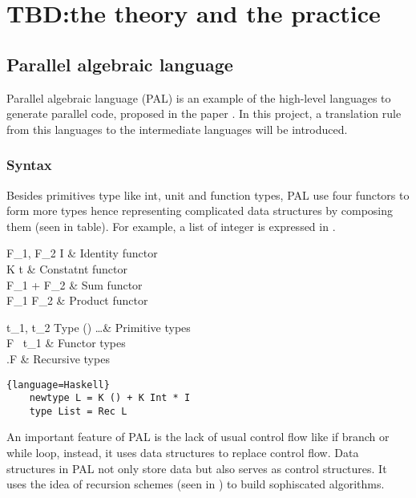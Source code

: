 \chapter{TBD:the theory and the practice}
\section{Parallel algebraic language} \label{b:pal}
Parallel algebraic language (PAL) is an example of the high-level languages to generate parallel code, proposed in the paper \cite{AlgebraicMultipartyProtocol}. In this project, a translation rule from this languages to the intermediate languages will be introduced.
\subsection{Syntax}
Besides primitives type like int, unit and function types, PAL use four functors to form more types hence representing complicated data structures by composing them (seen in table). For example, a list of integer is expressed in .
\begin{table}[ht]
\begin{grammar}{F_1, F_2 \Coloneqq}{}
    I & Identity functor\\
    K t & Constatnt functor\\
    F_1 + F_2 & Sum functor\\
    F_1 \times F_2 & Product functor
\end{grammar}
\hfill
\begin{grammar}{t_1, t_2 \Coloneqq}{Type}
    () \mid {} \mid \dots & Primitive types\\
    F \ t_1 & Functor types\\
    \mu .F & Recursive types\\
\end{grammar}
\caption{Functor and Type definitions}
\end{table}
\begin{code}
\begin{lstlisting}{language=Haskell}
    newtype L = K () + K Int * I
    type List = Rec L
\end{lstlisting}
\caption{Type of integer list in PAL}
\label{p:pal:c1}
\end{code}

An important feature of PAL is the lack of usual control flow like if branch or while loop, instead, it uses data structures to replace control flow. Data structures in PAL not only store data but also serves as control structures. It uses the idea of recursion schemes (seen in ) to build sophiscated algorithms. 


